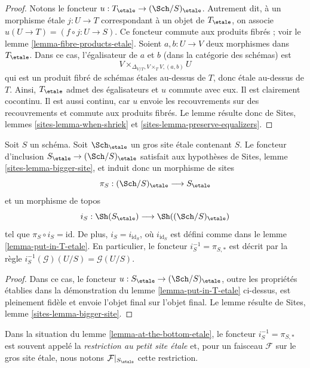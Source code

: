 \begin{proof}
Notons le foncteur $u : T_\etale \to (\Sch/S)_\etale$.
Autrement dit, à un morphisme étale $j : U \to T$ correspondant
à un objet de $T_\etale$, on associe $u(U \to T) = (f \circ j : U \to S)$.
Ce foncteur commute aux produits fibrés ; voir le
lemme \ref{lemma-fibre-products-etale}.
Soient $a, b : U \to V$ deux morphismes dans $T_\etale$.
Dans ce cas, l'égalisateur de $a$ et $b$ (dans la catégorie des schémas) est
$$
V \times_{\Delta_{V/T}, V \times_T V, (a, b)} U
$$
qui est un produit fibré de schémas étales au-dessus de $T$, donc étale
au-dessus de $T$. Ainsi, $T_\etale$ admet des égalisateurs et $u$ commute avec eux.
Il est clairement cocontinu.
Il est aussi continu, car $u$ envoie les recouvrements sur des recouvrements et
commute aux produits fibrés. Le lemme résulte donc de
Sites, lemmes \ref{sites-lemma-when-shriek}
et \ref{sites-lemma-preserve-equalizers}.
\end{proof}

\begin{lemma}
\label{lemma-at-the-bottom-etale}
Soit $S$ un schéma. Soit $\Sch_\etale$ un gros site
étale contenant $S$.
Le foncteur d'inclusion $S_\etale \to (\Sch/S)_\etale$
satisfait aux hypothèses de Sites, lemme \ref{sites-lemma-bigger-site},
et induit donc un morphisme de sites
$$
\pi_S : (\Sch/S)_\etale \longrightarrow S_\etale
$$
et un morphisme de topos
$$
i_S : \Sh(S_\etale) \longrightarrow \Sh((\Sch/S)_\etale)
$$
tel que $\pi_S \circ i_S = \text{id}$. De plus, $i_S = i_{\text{id}_S}$,
où $i_{\text{id}_S}$ est défini comme dans le lemme \ref{lemma-put-in-T-etale}.
En particulier, le foncteur $i_S^{-1} = \pi_{S, *}$ est décrit par la règle
$i_S^{-1}(\mathcal{G})(U/S) = \mathcal{G}(U/S)$.
\end{lemma}

\begin{proof}
Dans ce cas, le foncteur
$u : S_\etale \to (\Sch/S)_\etale$,
outre les propriétés établies dans la démonstration du
lemme \ref{lemma-put-in-T-etale} ci-dessus, est pleinement fidèle
et envoie l'objet final sur l'objet final.
Le lemme résulte de Sites, lemme \ref{sites-lemma-bigger-site}.
\end{proof}

\begin{definition}
\label{definition-restriction-small-etale}
Dans la situation du
lemme \ref{lemma-at-the-bottom-etale},
le foncteur $i_S^{-1} = \pi_{S, *}$ est souvent
appelé la {\it restriction au petit site étale} et, pour un faisceau
$\mathcal{F}$ sur le gros site étale, nous notons
$\mathcal{F}|_{S_\etale}$ cette restriction.
\end{definition}

